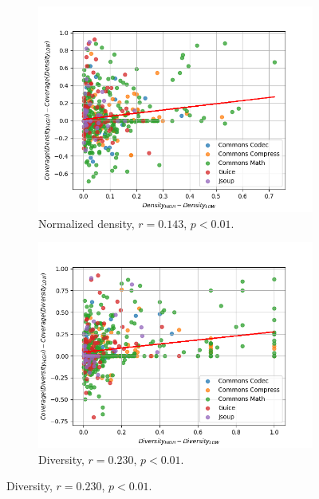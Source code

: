 \documentclass[twoside,a4paper,11pt]{memoir}
\begin{document}
\begin{figure}
    \centering
    \begin{subfigure}[b]{0.49\linewidth}
        \centering
        \includegraphics[width=\linewidth]{figures/delta_coverage_density}
        \caption{Normalized density, \(r=0.143 \), \(p<0.01 \).}%
        \label{fig:delta_coverage_density}
    \end{subfigure}
    \hfill
    \begin{subfigure}[b]{0.49\linewidth}
        \centering
        \includegraphics[width=\linewidth]{figures/delta_coverage_diversity}
        \caption{Diversity, \(r=0.230 \), \(p < 0.01 \).}%
        \label{fig:delta_coverage_diversity}
    \end{subfigure}

\end{figure}
\end{document}
